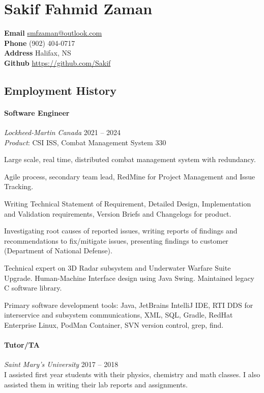 \documentclass[10pt, twocolumn]{article}
\begin{document}
\section*{\color{draculapurple}Sakif Fahmid Zaman}
\textbf{Email} \hfill \href{mailto:smfzaman@outlook.com}{smfzaman@outlook.com}\\
\textbf{Phone} \hfill (902) 404-0717\\
\textbf{Address} \hfill Halifax, NS\\
\textbf{Github} \hfill \url{https://github.com/Sakif}

\subsection*{\color{draculapurple}Employment History}
\paragraph{Software Engineer} \emph{Lockheed-Martin Canada} \hfill 2021 -- 2024\\
\emph{Product}: CSI ISS, Combat Management System 330

Large scale, real time, distributed combat management system with redundancy.

Agile process, secondary team lead, RedMine for Project Management and Issue Tracking.

Writing Technical Statement of Requirement, Detailed Design, Implementation and Validation requirements, Version Briefs and Changelogs for product.

Investigating root causes of reported issues, writing reports of findings and recommendations to fix/mitigate issues, presenting findings to customer (Department of National Defense).

Technical expert on 3D Radar subsystem and Underwater Warfare Suite Upgrade. Human-Machine Interface design using Java Swing. Maintained legacy C software library.

Primary software development tools: Java, JetBrains IntelliJ IDE, RTI DDS for interservice and subsystem communications, XML, SQL, Gradle, RedHat Enterprise Linux, PodMan Container, SVN version control, grep, find.

\paragraph{Tutor/TA} \emph{Saint Mary's University} \hfill 2017 -- 2018\\
I assisted first year students with their physics, chemistry and math classes. I also assisted them in writing their lab reports and assignments.
\end{document}
